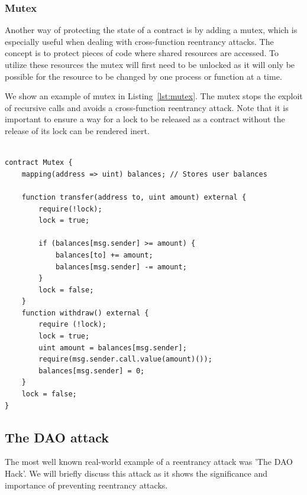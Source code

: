 \documentclass[10pt,conference]{IEEEtran}
\begin{document}
\subsubsection{Mutex}

Another way of protecting the state of a contract is by adding a mutex, which is especially useful when dealing with cross-function reentrancy attacks. The concept is to protect pieces of code where shared resources are accessed. To utilize these resources the mutex will first need to be unlocked as it will only be possible for the resource to be changed by one process or function at a time. 

We show an example of mutex in Listing~\ref{lst:mutex}. The mutex stops the exploit of recursive calls and avoids a cross-function reentrancy attack. Note that it is important to ensure a way for a lock to be released as a contract without the release of its lock can be rendered inert.

\begin{lstlisting}[language=Solidity, caption=Mutual exclusion, label={lst:mutex}]

contract Mutex {
    mapping(address => uint) balances; // Stores user balances

    function transfer(address to, uint amount) external {
        require(!lock);
        lock = true;
        
        if (balances[msg.sender] >= amount) {
            balances[to] += amount;
            balances[msg.sender] -= amount;
        }
        lock = false;
    }
    function withdraw() external {
        require (!lock);
        lock = true;
        uint amount = balances[msg.sender];
        require(msg.sender.call.value(amount)());
        balances[msg.sender] = 0;
    }
    lock = false;
}
\end{lstlisting}

\subsection{The DAO attack}
The most well known real-world example of a reentrancy attack was 'The DAO Hack'. We will briefly discuss this attack as it shows the significance and importance of preventing reentrancy attacks.
\end{document}
